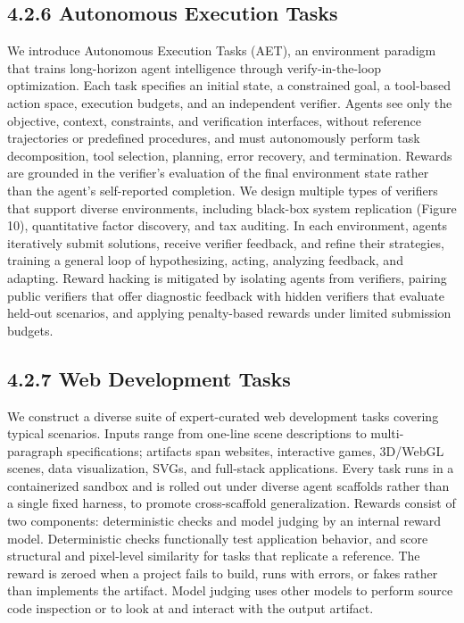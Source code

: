 \documentclass[
  10
]{article}
\begin{document}
\subsection{4.2.6 Autonomous Execution
Tasks}\label{autonomous-execution-tasks}

We introduce Autonomous Execution Tasks (AET), an environment paradigm
that trains long-horizon agent intelligence through verify-in-the-loop
optimization. Each task specifies an initial state, a constrained goal,
a tool-based action space, execution budgets, and an independent
verifier. Agents see only the objective, context, constraints, and
verification interfaces, without reference trajectories or predefined
procedures, and must autonomously perform task decomposition, tool
selection, planning, error recovery, and termination. Rewards are
grounded in the verifier's evaluation of the final environment state
rather than the agent's self-reported completion. We design multiple
types of verifiers that support diverse environments, including
black-box system replication (Figure 10), quantitative factor discovery,
and tax auditing. In each environment, agents iteratively submit
solutions, receive verifier feedback, and refine their strategies,
training a general loop of hypothesizing, acting, analyzing feedback,
and adapting. Reward hacking is mitigated by isolating agents from
verifiers, pairing public verifiers that offer diagnostic feedback with
hidden verifiers that evaluate held-out scenarios, and applying
penalty-based rewards under limited submission budgets.

\subsection{4.2.7 Web Development Tasks}\label{web-development-tasks}

We construct a diverse suite of expert-curated web development tasks
covering typical scenarios. Inputs range from one-line scene
descriptions to multi-paragraph specifications; artifacts span websites,
interactive games, 3D/WebGL scenes, data visualization, SVGs, and
full-stack applications. Every task runs in a containerized sandbox and
is rolled out under diverse agent scaffolds rather than a single fixed
harness, to promote cross-scaffold generalization. Rewards consist of
two components: deterministic checks and model judging by an internal
reward model. Deterministic checks functionally test application
behavior, and score structural and pixel-level similarity for tasks that
replicate a reference. The reward is zeroed when a project fails to
build, runs with errors, or fakes rather than implements the artifact.
Model judging uses other models to perform source code inspection or to
look at and interact with the output artifact.
\end{document}
